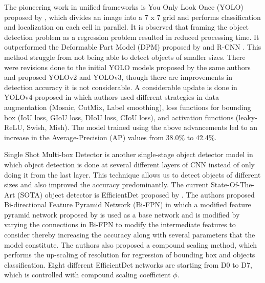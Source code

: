     The pioneering work in unified frameworks is You Only Look Once (YOLO) proposed by \citet{Redmon2016}, which divides an image into a 7 x 7 grid and performs classification and localization on each cell in parallel. It is observed that framing the object detection problem as a regression problem resulted in reduced processing time.  It outperformed the Deformable Part Model (DPM) proposed by \citet{DPM} and R-CNN \citet{Girshick2014}. This method struggle from not being able to detect objects of smaller sizes. There were revisions done to the initial YOLO models proposed by the same authors and proposed YOLOv2 and YOLOv3, though there are improvements in detection accuracy it is not considerable. A considerable update is done in YOLOv4 proposed \citet{Bochkovskiy2020} in which authors used different strategies in data augmentation (Mosaic, CutMix, Label smoothing), loss functions for bounding box (IoU loss, GIoU loss, DIoU loss, CIoU loss), and activation functions (leaky-ReLU, Swish, Mish). The model trained using the above advancements led to an increase in the Average-Precision (AP) values from 38.0\% to 42.4\%.
    

    Single Shot Multi-box Detector \citet{Liu2016SSDSS} is another single-stage object detector model in which object detection is done at several different layers of CNN instead of only doing it from the last layer. This technique allows us to detect objects of different sizes and also improved the accuracy predominantly. The current State-Of-The-Art (SOTA) object detector is EfficientDet proposed by \citet{Tan2020}. The authors proposed Bi-directional Feature Pyramid Network (Bi-FPN) in which a modified feature pyramid network proposed by \citet{Liu2018} is used as a base network and is modified by varying the connections in Bi-FPN to modify the intermediate features to consider thereby increasing the accuracy along with several parameters that the model constitute. The authors also proposed a compound scaling method, which performs the up-scaling of resolution for regression of bounding box and objects classification. Eight different EfficientDet networks are starting from D0 to D7, which is controlled with compound scaling coefficient $\phi$.
    
